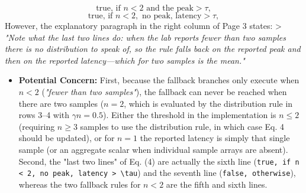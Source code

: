 \documentclass[11pt,a4paper]{article}
\begin{document}
$$\text{true, if } n < 2 \text{ and the peak} > \tau,$$
$$\text{true, if } n < 2, \text{ no peak, latency} > \tau,$$
However, the explanatory paragraph in the right column of Page 3 states:
> \emph{"Note what the last two lines do: when the lab reports fewer than two samples there is no distribution to speak of, so the rule falls back on the reported peak and then on the reported latency—which for two samples is the mean."}
\begin{itemize}[leftmargin=1.8em,itemsep=2pt]
\item \textbf{Potential Concern:} First, because the fallback branches only execute when $n < 2$ (\emph{"fewer than two samples"}), the fallback can never be reached when there are two samples ($n = 2$, which is evaluated by the distribution rule in rows 3–4 with $\gamma n = 0.5$). Either the threshold in the implementation is $n \le 2$ (requiring $n \ge 3$ samples to use the distribution rule, in which case Eq. 4 should be updated), or for $n = 1$ the reported latency is simply that single sample (or an aggregate scalar when individual sample arrays are absent). Second, the "last two lines" of Eq. (4) are actually the sixth line (\texttt{true, if n < 2, no peak, latency > \textbackslash{}tau}) and the seventh line (\texttt{false, otherwise}), whereas the two fallback rules for $n < 2$ are the fifth and sixth lines.
\end{itemize}
\end{document}
